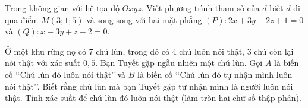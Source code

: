 \TL
\begin{ex}%
Trong không gian với hệ tọa độ $Oxyz$. Viết phương trình tham số của $d$ biết $d$ đi qua điểm $M(3; 1; 5)$ và song song với hai mặt phẳng $(P)\colon 2x+3y-2z+1=0$ và $(Q)\colon x-3y+z-2=0$. %
\end{ex}

\begin{ex}%
Ở một khu rừng nọ có $7$ chú lùn, trong đó có $4$ chú luôn nói thật, $3$ chú còn lại nói thật với  xác suất $0{,}5$. Bạn Tuyết gặp ngẫu nhiên một chú lùn. Gọi $A$ là biến cố \lq\lq Chú lùn đó luôn nói thật\rq\rq\,và $B$ là biến cố \lq\lq Chú lùn đó tự nhận mình luôn nói thật\rq\rq. Biết rằng chú lùn mà bạn Tuyết gặp tự nhận mình là người luôn nói thật. Tính xác suất để chú lùn đó luôn nói thật (làm tròn hai chữ số thập phân).
\end{ex}

